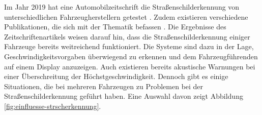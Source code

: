 Im Jahr 2019 hat eine Automobilzeitschrift die Straßenschilderkennung von unterschiedlichen Fahrzeugherstellern getestet \cite{strassenschilderkennungTest}. Zudem existieren verschiedene Publikationen, die sich mit der Thematik befassen \cite{traffic-sign-detection-review-2014}. Die Ergebnisse des Zeitschriftenartikels weisen darauf hin, dass die Straßenschilderkennung einiger Fahrzeuge bereits weitreichend funktioniert. Die Systeme sind dazu in der Lage, Geschwindigkeitsvorgaben überwiegend zu erkennen und dem Fahrzeugführenden auf einem Display anzuzeigen. Auch existieren bereits akustische Warnungen bei einer Überschreitung der Höchstgeschwindigkeit. Dennoch gibt es einige Situationen, die bei mehreren Fahrzeugen zu Problemen bei der Straßenschilderkennung geführt haben. Eine Auswahl davon zeigt Abbildung \ref{fig:einfluesse-strscherkennung}.  \cite{strassenschilderkennungTest} 

